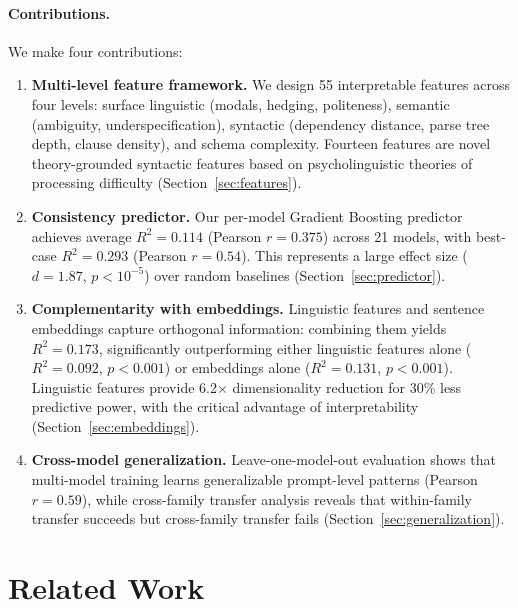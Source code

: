 \documentclass{article}
\begin{document}
\paragraph{Contributions.} We make four contributions:
\begin{enumerate}[itemsep=2pt, parsep=0pt]
\item \textbf{Multi-level feature framework.} We design 55 interpretable features across four levels: surface linguistic (modals, hedging, politeness), semantic (ambiguity, underspecification), syntactic (dependency distance, parse tree depth, clause density), and schema complexity. Fourteen features are novel theory-grounded syntactic features based on psycholinguistic theories of processing difficulty (Section~\ref{sec:features}).

\item \textbf{Consistency predictor.} Our per-model Gradient Boosting predictor achieves average $R^2 = 0.114$ (Pearson $r = 0.375$) across 21 models, with best-case $R^2 = 0.293$ (Pearson $r = 0.54$). This represents a large effect size ($d = 1.87$, $p < 10^{-5}$) over random baselines (Section~\ref{sec:predictor}).

\item \textbf{Complementarity with embeddings.} Linguistic features and sentence embeddings capture orthogonal information: combining them yields $R^2 = 0.173$, significantly outperforming either linguistic features alone ($R^2 = 0.092$, $p < 0.001$) or embeddings alone ($R^2 = 0.131$, $p < 0.001$). Linguistic features provide 6.2$\times$ dimensionality reduction for 30\% less predictive power, with the critical advantage of interpretability (Section~\ref{sec:embeddings}).

\item \textbf{Cross-model generalization.} Leave-one-model-out evaluation shows that multi-model training learns generalizable prompt-level patterns (Pearson $r = 0.59$), while cross-family transfer analysis reveals that within-family transfer succeeds but cross-family transfer fails (Section~\ref{sec:generalization}).
\end{enumerate}


\section{Related Work}
\label{sec:related}
\end{document}
